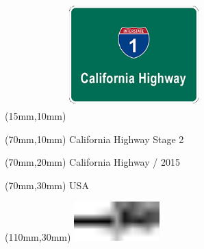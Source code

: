 \null\newpage
\begin{textblock*}{50mm}(15mm,10mm)%
\includegraphics[width=50mm]{LG/CAL.png}
\end{textblock*}
\begin{textblock*}{130mm}(70mm,10mm)%
{\fontsize{20}{20}\selectfont California Highway Stage 2}\\
\end{textblock*}
\begin{textblock*}{120mm}(70mm,20mm)%
{\fontsize{16}{16}\selectfont California Highway / 2015}\\
\end{textblock*}
\begin{textblock*}{120mm}(70mm,30mm)%
{\fontsize{12}{12}\selectfont USA}
\end{textblock*}
\begin{textblock*}{30mm}(110mm,30mm)%
\centering
\includegraphics[height=15mm]{icons/tofinish.pdf}
\end{textblock*}
